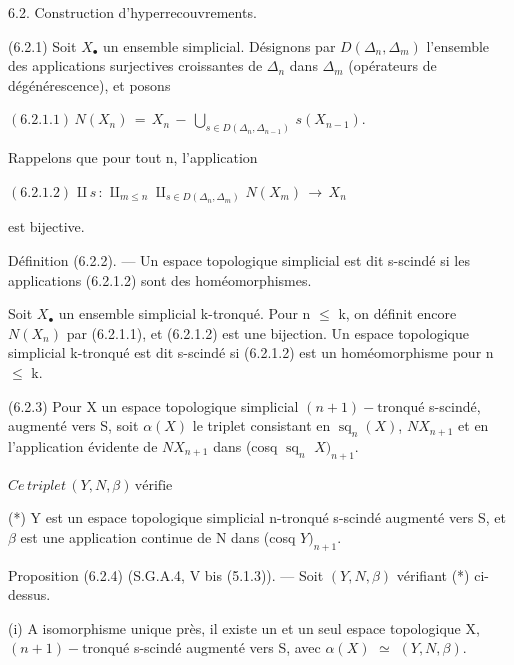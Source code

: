 \documentclass[11pt,twoside]{article}
\newcommand{\DFormula}[1]{%
  \par\smallskip\noindent\hspace*{0pt}\(\displaystyle #1\)\par\smallskip
}
\begin{document}
6.2. Construction d’hyperrecouvrements.\par
\par\medskip
(6.2.1) Soit \(X_{\bullet }\) un ensemble simplicial. Désignons par \(D(\Delta _{n},\Delta _{m})\) l’ensemble des applications surjectives croissantes de \(\Delta _{n}\) dans \(\Delta _{m}\) (opérateurs de dégénérescence), et posons\par
\par\medskip
\DFormula{(6.2.1.1)\,N(X_{n})\,=\,X_{n}\,−\,⋃_{s\in D(\Delta _{n},\Delta _{n−1})}\,s(X_{n−1}).}
\par\medskip
Rappelons que pour tout n, l’application\par
\par\medskip
\DFormula{(6.2.1.2)\,⨿s\,:\,⨿_{m\leq n}\,⨿_{s\in D(\Delta _{n},\Delta _{m})}\,N(X_{m})\,\to \,X_{n}}
\par\medskip
est bijective.\par
\par\medskip
Définition (6.2.2). — Un espace topologique simplicial est dit s-scindé si les applications (6.2.1.2) sont des homéomorphismes.\par
\par\medskip
Soit \(X_{\bullet }\) un ensemble simplicial k-tronqué. Pour n \(\leq \) k, on définit encore \(N(X_{n})\) par (6.2.1.1), et (6.2.1.2) est une bijection. Un espace topologique simplicial k-tronqué est dit s-scindé si (6.2.1.2) est un homéomorphisme pour n \(\leq \) k.\par
\par\medskip
(6.2.3) Pour X un espace topologique simplicial \((n+1)-\text{tronqué}\) s-scindé, augmenté vers S, soit \(\alpha (X)\) le triplet consistant en \(\operatorname{sq}_{n}(X)\), \(NX_{n+1}\) et en l’application évidente de \(NX_{n+1}\) dans (cosq \(\operatorname{sq}_{n}\) \(X)_{n+1}\).\par
\par\medskip
\DFormula{Ce\,triplet\,(Y,N,\beta )\,\text{vérifie}}
\par\medskip
(*) Y est un espace topologique simplicial n-tronqué s-scindé augmenté vers S, et \(\beta \) est une application continue de N dans (cosq \(Y)_{n+1}\).\par
\par\medskip
Proposition (6.2.4) (S.G.A.4, V bis (5.1.3)). — Soit \((Y,N,\beta )\) vérifiant (*) ci-dessus.\par
\par\medskip
(i) A isomorphisme unique près, il existe un et un seul espace topologique X, \((n+1)-\text{tronqué}\) s-scindé augmenté vers S, avec \(\alpha (X)\) \(\simeq \) \((Y,N,\beta )\).\par
\end{document}
